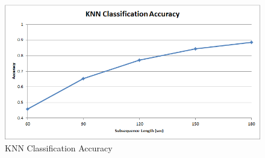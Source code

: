 \begin{figure}[!h]
\centering
\includegraphics[scale=0.50]{Figures/experiment_knn}
\caption{KNN Classification Accuracy}
\label{fig:experiment_knn}
\vspace{-5mm}
\end{figure}